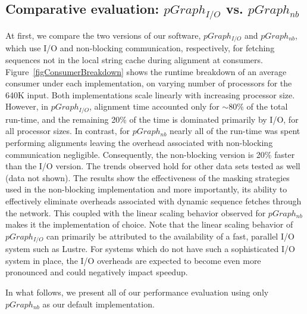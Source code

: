 \documentclass[10pt,journal,letterpaper,compsoc]{IEEEtran}
\begin{document}
\subsection{Comparative evaluation: $pGraph_{I/O}$ vs. $pGraph_{nb}$}
\label{secComp}


At first, we compare the two versions of our software, $pGraph_{I/O}$ and $pGraph_{nb}$, which  use I/O and non-blocking communication, respectively, for fetching sequences not in the local string cache during alignment at consumers. Figure~\ref{figConsumerBreakdown} shows the runtime breakdown of an average consumer under each implementation, on varying number of processors for the 640K input. Both implementations scale linearly with increasing processor size. However, in $pGraph_{I/O}$, alignment time accounted only for $\sim 80$\% of the total run-time, and the remaining 20\% of the time is dominated primarily by I/O, for all processor sizes. In contrast, for $pGraph_{nb}$ nearly all of the run-time was spent performing alignments leaving the overhead associated with non-blocking communication negligible. Consequently, the non-blocking version is 20\% faster than the I/O version. The trends observed hold for other data sets tested as well (data not shown). The results show the effectiveness of the masking strategies used in the non-blocking implementation and more importantly, its ability to effectively eliminate overheads associated with dynamic sequence fetches through the network. This coupled with the linear scaling behavior observed for $pGraph_{nb}$ makes it the implementation of choice. Note that the linear scaling behavior of  $pGraph_{I/O}$ can primarily be attributed to the availability of a fast, parallel I/O system such as Lustre. For systems which do not have such a sophisticated I/O system in place, the I/O overheads are expected to become even more pronounced and could negatively impact speedup. 

In what follows, we present all of our performance evaluation using only $pGraph_{nb}$ as our default implementation.
\end{document}
